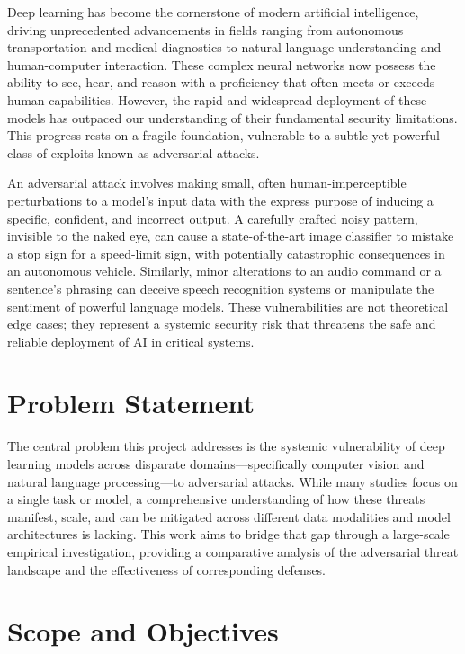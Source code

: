 \documentclass[../main.tex]{subfiles}
\begin{document}
Deep learning has become the cornerstone of modern artificial intelligence, driving unprecedented advancements in fields ranging from autonomous transportation and medical diagnostics to natural language understanding and human-computer interaction. These complex neural networks now possess the ability to see, hear, and reason with a proficiency that often meets or exceeds human capabilities. However, the rapid and widespread deployment of these models has outpaced our understanding of their fundamental security limitations. This progress rests on a fragile foundation, vulnerable to a subtle yet powerful class of exploits known as adversarial attacks.

An adversarial attack involves making small, often human-imperceptible perturbations to a model's input data with the express purpose of inducing a specific, confident, and incorrect output. A carefully crafted noisy pattern, invisible to the naked eye, can cause a state-of-the-art image classifier to mistake a stop sign for a speed-limit sign, with potentially catastrophic consequences in an autonomous vehicle. Similarly, minor alterations to an audio command or a sentence's phrasing can deceive speech recognition systems or manipulate the sentiment of powerful language models. These vulnerabilities are not theoretical edge cases; they represent a systemic security risk that threatens the safe and reliable deployment of AI in critical systems.

\section{Problem Statement}
\label{sec:problem_statement}

The central problem this project addresses is the systemic vulnerability of deep learning models across disparate domains---specifically computer vision and natural language processing---to adversarial attacks. While many studies focus on a single task or model, a comprehensive understanding of how these threats manifest, scale, and can be mitigated across different data modalities and model architectures is lacking. This work aims to bridge that gap through a large-scale empirical investigation, providing a comparative analysis of the adversarial threat landscape and the effectiveness of corresponding defenses.

\section{Scope and Objectives}
\label{sec:scope_objectives}
\end{document}
